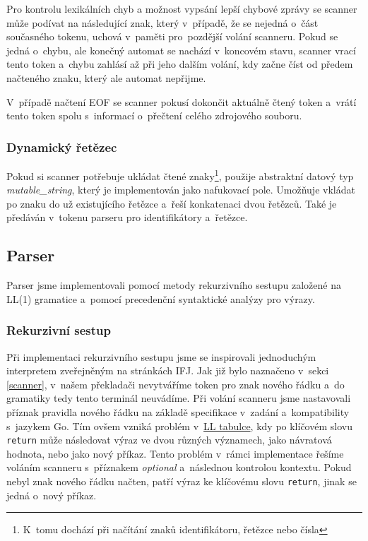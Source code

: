 \documentclass[11pt]{article}
\begin{document}
Pro kontrolu lexikálních chyb a možnost vypsání lepší chybové zprávy se scanner může podívat na následující znak, který v~případě, že se nejedná o~část současného tokenu, uchová v~paměti pro~pozdější volání scanneru. Pokud se jedná o~chybu, ale konečný automat se nachází v~koncovém stavu, scanner vrací tento token a~chybu zahlásí až při jeho dalším volání, kdy začne číst od předem načteného znaku, který ale automat nepřijme.

V~případě načtení EOF se scanner pokusí dokončit aktuálně čtený token a~vrátí tento token spolu s~informací o~přečtení celého zdrojového souboru.

\subsubsection{Dynamický řetězec}
Pokud si scanner potřebuje ukládat čtené znaky\footnote{K~tomu dochází při načítání znaků identifikátoru, řetězce nebo čísla}, použije abstraktní datový typ \emph{mutable\_string}, který je implementován jako nafukovací pole. Umožňuje vkládat po znaku do už existujícího řetězce a~řeší konkatenaci dvou řetězců. Také je předáván v~tokenu parseru pro identifikátory a~řetězce.

\subsection{Parser}

Parser jsme implementovali pomocí metody rekurzivního sestupu založené na LL(1) gramatice a~pomocí precedenční syntaktické analýzy pro výrazy.

\subsubsection{Rekurzivní sestup}

Při implementaci rekurzivního sestupu jsme se inspirovali jednoduchým interpretem zveřejněným na stránkách IFJ. Jak již bylo naznačeno v~sekci \ref{scanner}, v~našem překladači nevytváříme token pro znak nového řádku a~do gramatiky tedy tento terminál neuvádíme. Při volání scanneru jsme nastavovali příznak pravidla nového řádku na základě specifikace v~zadání a~kompatibility s~jazykem Go. Tím ovšem vzniká problém v~\hyperref[sec:ll-tab]{LL tabulce}, kdy po klíčovém slovu \texttt{return} může následovat výraz ve dvou různých významech, jako návratová hodnota, nebo jako nový příkaz. Tento problém v~rámci implementace řešíme voláním scanneru s~příznakem \textit{optional} a~následnou kontrolou kontextu. Pokud nebyl znak nového řádku načten, patří výraz ke klíčovému slovu \texttt{return}, jinak se jedná o~nový příkaz.
\end{document}
